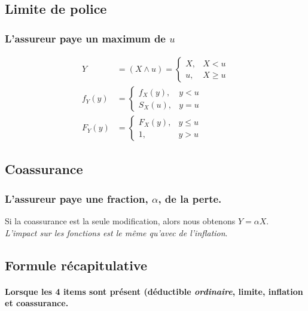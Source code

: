 \documentclass[10pt, french]{article}
\begin{document}
\begin{multicols*}{3}
\subsection*{Limite de police}
\subsubsection*{L'assureur paye un maximum de $u$}

\begin{align*}
Y 	&= (X \wedge u)
	= 
	\left\{
		\begin{array}{ll}
			X, & X < u \\
			u, & X \geq u
		\end{array}
	\right. \\
f_Y(y) &=
		\left\{
			\begin{array}{ll}
				f_X(y), & y < u \\
				S_X(u), & y = u
			\end{array}
		\right. \\
F_Y(y) &=
		\left\{
			\begin{array}{ll}
				F_X(y), & y \leq u \\
				1, & y > u
			\end{array}
		\right. 
\end{align*}

\subsection*{Coassurance}
\subsubsection*{L'assureur paye une fraction, $\alpha$, de la perte.}

Si la coassurance est la seule modification, alors nous obtenons $Y = \alpha X$. \\
\textit{L'impact sur les fonctions est le même qu'avec de l'inflation}.

\subsection*{Formule récapitulative}
\paragraph{Lorsque les 4 items sont présent (déductible \textit{ordinaire}, limite, inflation et coassurance.}


\end{multicols*}
\end{document}
